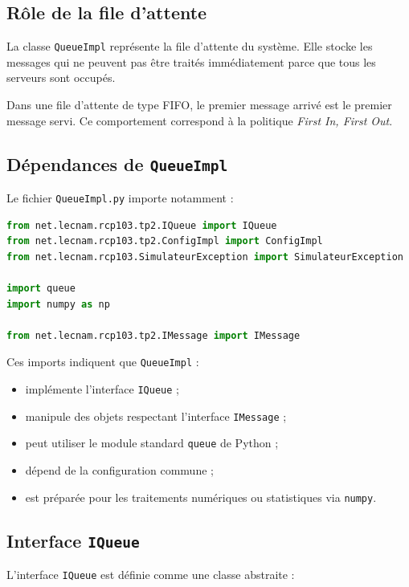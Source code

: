 \documentclass{article}
\begin{document}
\subsection{Rôle de la file d’attente}

La classe \texttt{QueueImpl} représente la file d’attente du système. Elle stocke les messages qui ne peuvent pas être traités immédiatement parce que tous les serveurs sont occupés.

Dans une file d’attente de type FIFO, le premier message arrivé est le premier message servi. Ce comportement correspond à la politique \textit{First In, First Out}.

\subsection{Dépendances de \texttt{QueueImpl}}

Le fichier \texttt{QueueImpl.py} importe notamment :

\begin{lstlisting}[language=Python, caption=Imports principaux de QueueImpl.py]
from net.lecnam.rcp103.tp2.IQueue import IQueue
from net.lecnam.rcp103.tp2.ConfigImpl import ConfigImpl
from net.lecnam.rcp103.SimulateurException import SimulateurException

import queue
import numpy as np

from net.lecnam.rcp103.tp2.IMessage import IMessage
\end{lstlisting}

Ces imports indiquent que \texttt{QueueImpl} :
\begin{itemize}[leftmargin=*]
    \item implémente l’interface \texttt{IQueue} ;
    \item manipule des objets respectant l’interface \texttt{IMessage} ;
    \item peut utiliser le module standard \texttt{queue} de Python ;
    \item dépend de la configuration commune ;
    \item est préparée pour les traitements numériques ou statistiques via \texttt{numpy}.
\end{itemize}

\subsection{Interface \texttt{IQueue}}

L’interface \texttt{IQueue} est définie comme une classe abstraite :
\end{document}
